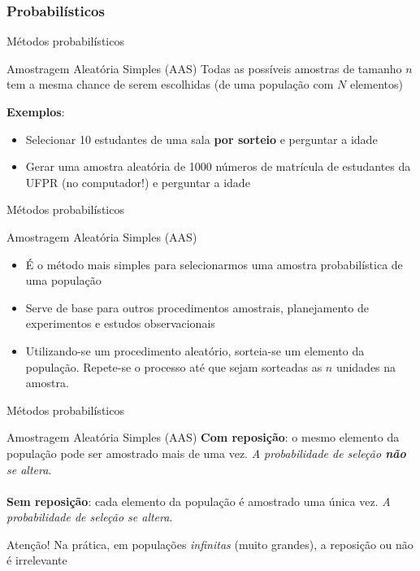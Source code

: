 \documentclass[10pt]{beamer}
\theoremstyle{definition}
\begin{document}
\subsubsection{Probabilísticos}

\begin{frame}{Métodos probabilísticos}
  \begin{block}{Amostragem Aleatória Simples (AAS)}
    Todas as possíveis amostras de tamanho $n$ tem a mesma chance de
    serem escolhidas (de uma população com $N$ elementos)
  \end{block}
  \textbf{Exemplos}:
  \begin{itemize}
  \item Selecionar 10 estudantes de uma sala \textbf{por sorteio} e
    perguntar a idade
  \item Gerar uma amostra aleatória de 1000 números de matrícula de
    estudantes da UFPR (no computador!) e perguntar a idade
  \end{itemize}
\end{frame}

\begin{frame}{Métodos probabilísticos}
  \begin{block}{Amostragem Aleatória Simples (AAS)}
    \begin{itemize}
    \item É o método mais simples para selecionarmos uma amostra
      probabilística de uma população
    \item Serve de base para outros procedimentos amostrais,
      planejamento de experimentos e estudos observacionais
    \item Utilizando-se um procedimento aleatório, sorteia-se um
      elemento da população. Repete-se o  processo até que sejam
      sorteadas as $n$ unidades na amostra.
    \end{itemize}
  \end{block}
\end{frame}

\begin{frame}{Métodos probabilísticos}
  \begin{block}{Amostragem Aleatória Simples (AAS)}
    \textbf{Com reposição}: o mesmo elemento da população pode ser amostrado
    mais de uma vez. \textsl{A probabilidade de seleção \textbf{não} se
      altera}. \\~\\
    \textbf{Sem reposição}: cada elemento da população é amostrado uma
    única vez. \textsl{A probabilidade de seleção se altera}.
  \end{block}
  \begin{alertblock}{Atenção!}
    Na prática, em populações \textit{infinitas} (muito grandes), a
    reposição ou não é irrelevante
  \end{alertblock}
\end{frame}
\end{document}
